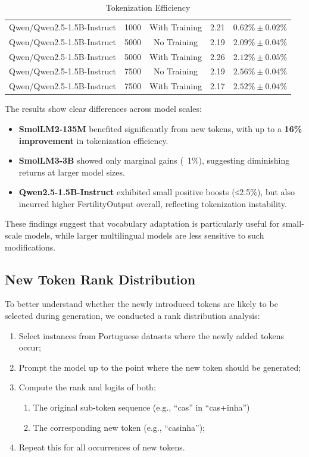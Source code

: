 \begin{table}[H]
\begin{tabular}{lcccc}
Qwen/Qwen2.5-1.5B-Instruct &               1000 &  With Training &         2.21 &   $0.62\% \pm 0.02\%$ \\
Qwen/Qwen2.5-1.5B-Instruct &               5000 &    No Training &         2.19 &   $2.09\% \pm 0.04\%$ \\
Qwen/Qwen2.5-1.5B-Instruct &               5000 &  With Training &         2.26 &   $2.12\% \pm 0.05\%$ \\
Qwen/Qwen2.5-1.5B-Instruct &               7500 &    No Training &         2.19 &   $2.56\% \pm 0.04\%$ \\
Qwen/Qwen2.5-1.5B-Instruct &               7500 &  With Training &         2.17 &   $2.52\% \pm 0.04\%$ \\
\bottomrule
\end{tabular}
\caption{Tokenization Efficiency}
\label{tab:fertility_results}
\end{table}

The results show clear differences across model scales:
\begin{itemize}
    \item \textbf{SmolLM2-135M} benefited significantly from new tokens, with up to a \textbf{16\% improvement} in tokenization efficiency.
    \item \textbf{SmolLM3-3B} showed only marginal gains (~1\%), suggesting diminishing returns at larger model sizes.
    \item \textbf{Qwen2.5-1.5B-Instruct} exhibited small positive boosts (≤2.5\%), but also incurred higher FertilityOutput overall, reflecting tokenization instability.
\end{itemize}

These findings suggest that vocabulary adaptation is particularly useful for small-scale models, while larger multilingual models are less sensitive to such modifications.




\subsection{New Token Rank Distribution}

To better understand whether the newly introduced tokens are likely to be selected during generation, we conducted a rank distribution analysis: 
\begin{enumerate}
    \item Select instances from Portuguese datasets where the newly added tokens occur;  
    \item Prompt the model up to the point where the new token should be generated;  
    \item Compute the rank and logits of both:
        \begin{enumerate}
            \item The original sub-token sequence (e.g., ``cas'' in ``cas+inha'')
            \item The corresponding new token (e.g., ``casinha''); 
        \end{enumerate}
    \item Repeat this for all occurrences of new tokens.  
\end{enumerate}


